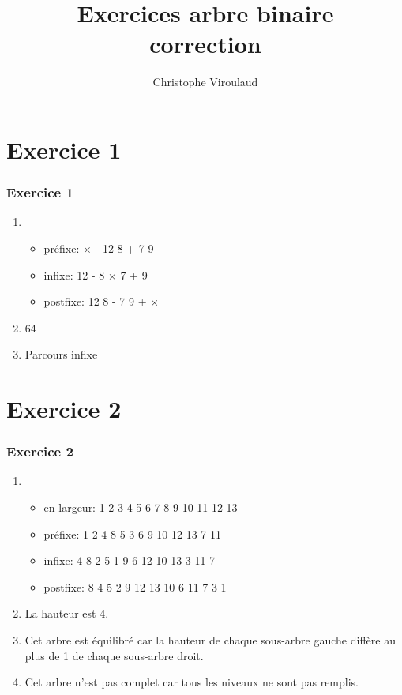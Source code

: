 \documentclass[svgnames,11pt]{beamer}
\author[]{Christophe Viroulaud}
\title{Exercices arbre binaire\\correction}
\date{\framebox{\textbf{Algo 08}}}
\institute{Terminale - NSI}
\begin{document}
\begin{frame}
    \titlepage
\end{frame}
\section{Exercice 1}
\begin{frame}
    \frametitle{Exercice 1}

    \begin{enumerate}
        \item \begin{itemize}
                  \item préfixe: × - 12 8 + 7 9
                  \item infixe: 12 - 8 × 7 + 9
                  \item postfixe: 12 8 - 7 9 + ×
              \end{itemize}
        \item 64
        \item Parcours infixe
    \end{enumerate}

\end{frame}
\section{Exercice 2}
\begin{frame}
    \frametitle{Exercice 2}

    \begin{enumerate}
        \item
              \begin{itemize}
                  \item en largeur: 1 2 3 4 5 6 7 8 9 10 11 12 13
                  \item préfixe: 1 2 4 8 5 3 6 9 10 12 13 7 11
                  \item infixe: 4 8 2 5 1 9 6 12 10 13 3 11 7
                  \item postfixe: 8 4 5 2 9 12 13 10 6 11 7 3 1

              \end{itemize}
        \item La hauteur est 4.
        \item Cet arbre est équilibré car la hauteur de chaque sous-arbre gauche diffère au plus de 1 de chaque sous-arbre droit.
        \item Cet arbre n'est pas complet car tous les niveaux ne sont pas remplis.
    \end{enumerate}

\end{frame}
\end{document}
